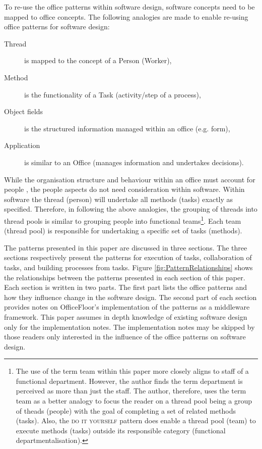 \documentclass[prodmode]{style/acmlarge}
\begin{document}
To re-use the office patterns within software design, software concepts need to
be mapped to office concepts.  The following analogies are made to enable
re-using office patterns for software design:
\begin{description}
  \item[Thread] is mapped to the concept of a Person (Worker),
  \item[Method] is the functionality of a Task (activity/step of a process),
  \item[Object fields] is the structured information managed within an office (e.g. form),
  \item[Application] is similar to an Office (manages information and undertakes decisions).
\end{description}

While the organisation structure and behaviour within an office must account for
people \cite{organisational-behaviour}, the people aspects do not need
consideration within software.  Within software the thread (person) will
undertake all methods (tasks) exactly as specified.  Therefore, in following the
above analogies, the grouping of threads into thread pools is similar to
grouping people into functional teams\footnote{The use of the term team within
this paper more closely aligns to staff of a functional department.  However,
the author finds the term department is perceived as more than just the staff. 
The author, therefore, uses the term team as a better analogy to focus the
reader on a thread pool being a group of theads (people) with the goal of
completing a set of related methods (tasks).  Also, the \textsc{do it yourself}
pattern does enable a thread pool (team) to execute methods (tasks) outside its
responsible category (functional departmentalisation).}.  Each team (thread
pool) is responsible for undertaking a specific set of tasks (methods).

The patterns presented in this paper are discussed in three sections.  The three
sections respectively present the patterns for execution of tasks, collaboration
of tasks, and building processes from tasks.  Figure
\ref{fig:PatternRelationships} shows the relationships between the patterns
presented in each section of this paper.  Each section is written in two parts. 
The first part lists the office patterns and how they influence change in the
software design.  The second part of each section provides notes on
OfficeFloor's implementation of the patterns as a middleware framework.  This
paper assumes in depth knowledge of existing software design only for the
implementation notes.  The implementation notes may be skipped by those readers
only interested in the influence of the office patterns on software design.
\end{document}
